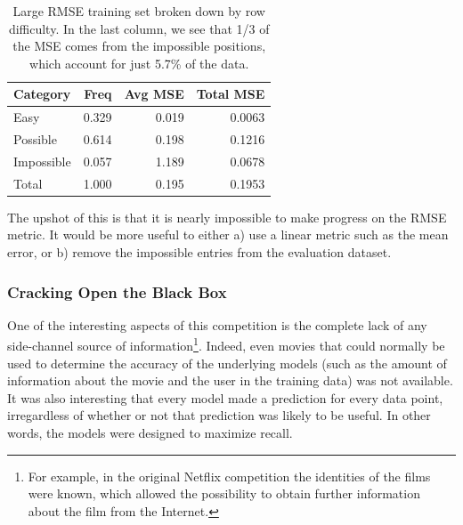 \documentclass{article}
\begin{document}
\begin{table}[t]
\caption{Large RMSE training set broken down by row difficulty.  In the last column, we see that 1/3 of the MSE comes from the impossible positions, which account for just 5.7\% of the data.}
\label{table:row-types-rmse}
\vskip 0.15in
\begin{center}
\begin{small}
\begin{sc}
\begin{tabular}{lrrr}
\hline
\abovespace\belowspace
Category & Freq & Avg MSE & Total MSE \\
\hline
\abovespace
Easy          & 0.329 & 0.019 & 0.0063 \\
Possible      & 0.614 & 0.198 & 0.1216 \\
Impossible    & 0.057 & 1.189 & 0.0678 \\
\abovespace\belowspace
Total         & 1.000 & 0.195 & 0.1953 \\
\hline
\end{tabular}
\end{sc}
\end{small}
\end{center}
\vskip -0.1in
\end{table}

The upshot of this is that it is nearly impossible to make progress on the RMSE metric.  It would be more useful to either a) use a linear metric such as the mean error, or b) remove the impossible entries from the evaluation dataset.

\subsubsection{Cracking Open the Black Box}

One of the interesting aspects of this competition is the complete lack of any
side-channel source of information\footnote{For example, in the original Netflix
competition the identities of the films were known, which allowed the
possibility to obtain further information about the film from the Internet.}.  Indeed, even movies that could normally be used to determine the accuracy of the underlying models (such as the amount of information about the movie and the user in the training data) was not available.  It was also interesting that every model made a prediction for every data point, irregardless of whether or not that prediction was likely to be useful.  In other words, the models were designed to maximize recall.
\end{document}
